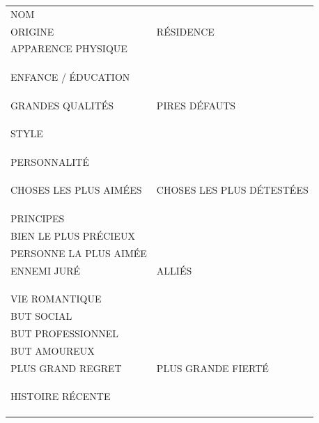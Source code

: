 \documentclass[a5paper,french]{article}
\begin{document}
\begin{tabular}[c]{ p{} p{} }
	NOM						&									\\
	ORIGINE					&		RÉSIDENCE					\\
	APPARENCE PHYSIQUE		&									\\
							&									\\
							&									\\
							&									\\
	ENFANCE / ÉDUCATION		&									\\
							&									\\
							&									\\
							&									\\
	GRANDES QUALITÉS		&		PIRES DÉFAUTS				\\
							&									\\
							&									\\
							&									\\
	STYLE					&									\\
							&									\\
							&									\\
							&									\\
	PERSONNALITÉ			&									\\
							&									\\
							&									\\
							&									\\
	CHOSES LES PLUS AIMÉES	&		CHOSES LES PLUS DÉTESTÉES	\\
							&									\\
							&									\\
							&									\\
	PRINCIPES				&									\\
	BIEN LE PLUS PRÉCIEUX	&									\\
	PERSONNE LA PLUS AIMÉE	&									\\
	ENNEMI JURÉ				&		ALLIÉS						\\
							&									\\
							&									\\
							&									\\
	VIE ROMANTIQUE			&									\\
	BUT SOCIAL				&									\\
	BUT PROFESSIONNEL		&									\\
	BUT AMOUREUX			&									\\
	PLUS GRAND REGRET		&		PLUS GRANDE FIERTÉ			\\
							&									\\
							&									\\
							&									\\
	HISTOIRE RÉCENTE		&									\\
							&									\\
							&									\\
							&									\\
\end{tabular}
\end{document}
